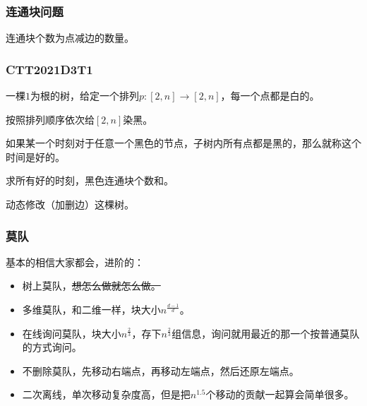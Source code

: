 \documentclass[10pt]{beamer}
\begin{document}
	\clearpage
	\begin{frame}
		\frametitle{连通块问题}
	
		连通块个数为点减边的数量。
	
	\end{frame}
	\clearpage
	\begin{frame}
		\frametitle{CTT2021D3T1}
	
		一棵$1$为根的树，给定一个排列$p:[2,n]\rightarrow [2,n]$，每一个点都是白的。

		按照排列顺序依次给$[2,n]$染黑。

		如果某一个时刻对于任意一个黑色的节点，子树内所有点都是黑的，那么就称这个时间是好的。

		求所有好的时刻，黑色连通块个数和。

		动态修改（加删边）这棵树。
	
	\end{frame}
	\clearpage
	\begin{frame}
		\frametitle{莫队}
	
		基本的相信大家都会，进阶的：

		\begin{itemize}
			\item 树上莫队，\sout{想怎么做就怎么做。}
			\item 多维莫队，和二维一样，块大小$n^{\frac{d-1}{d}}$。
			\item 在线询问莫队，块大小$n^{\frac 23}$，存下$n^{\frac 23}$组信息，询问就用最近的那一个按普通莫队的方式询问。
			\item 不删除莫队，先移动右端点，再移动左端点，然后还原左端点。
			\item 二次离线，单次移动复杂度高，但是把$n^{1.5}$个移动的贡献一起算会简单很多。
		\end{itemize}
	
	\end{frame}
\end{document}
